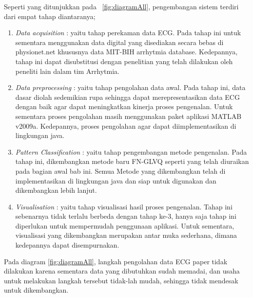 
Seperti yang ditunjukkan pada \pic~\ref{fig:diagramAll}, pengembangan sistem
terdiri dari empat tahap diantaranya;
\begin{enumerate}
  \item \emph{Data acquisition} : yaitu tahap perekaman data ECG. Pada tahap
  ini untuk sementara menggunakan data digital yang disediakan secara bebas di
  physionet.net khususnya data MIT-BIH arrhytmia database. Kedepannya, tahap ini dapat
  disubstitusi dengan penelitian yang telah dilakukan oleh peneliti lain dalam tim Arrhytmia.
  \item \emph{Data preprocessing} : yaitu tahap pengolahan data awal. Pada tahap
  ini, data dasar diolah sedemikian rupa sehingga dapat merepresentasikan data
  ECG dengan baik agar dapat meningkatkan kinerja proses pengenalan. Untuk
  sementara proses pengolahan masih menggunakan paket aplikasi MATLAB v2009a.
  Kedepannya, proses pengolahan agar dapat diimplementasikan di lingkungan java.
  \item \emph{Pattern Classification} : yaitu tahap pengembangan metode
  pengenalan. Pada tahap ini, dikembangkan metode baru FN-GLVQ seperti yang
  telah diuraikan pada bagian awal bab ini. Semua Metode yang dikembangkan telah
  di implementasikan di lingkungan java dan siap untuk digunakan dan
  dikembangkan lebih lanjut.
  \item \emph{Visualisation} : yaitu tahap visualisasi hasil proses pengenalan.
  Tahap ini sebenarnya tidak terlalu berbeda dengan tahap ke-3, hanya saja tahap
  ini diperlukan untuk mempermudah penggunaan aplikasi. Untuk sementara,
  visualisasi yang dikembangkan merupakan antar muka sederhana, dimana
  kedepannya dapat disempurnakan.
\end{enumerate}

Pada diagram \ref{fig:diagramAll}, langkah pengolahan data ECG paper tidak
dilakukan karena sementara data yang dibutuhkan sudah memadai, dan usaha untuk
melakukan langkah tersebut tidak-lah mudah, sehingga tidak  mendesak untuk
dikembangkan.

